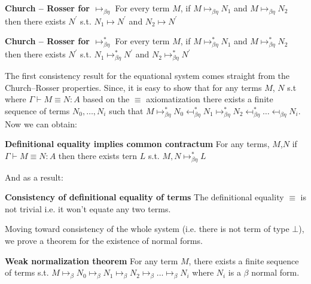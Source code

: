 \begin{mdframed}
	\begin{theorem}	\textbf{Church -- Rosser for $\mapsto_{\beta\eta}$}
		For every term $M$, if $M\mapsto_{\beta\eta} N_1$ and $M \mapsto_{\beta\eta} N_2$ then there exists $N^{'}$ s.t. $N_1 \mapsto N^{'}$ and $N_2\mapsto N^{'}$
		
	\end{theorem}	
	\begin{theorem}	\textbf{Church -- Rosser for $\mapsto_{\beta\eta}^{*}$}
		For every term $M$, if $M\mapsto_{\beta\eta}^{*} N_1$ and $M \mapsto_{\beta\eta}^{*} N_2$ then there exists $N^{'}$ s.t. $N_1 \mapsto_{\beta\eta}^{*} N^{'}$ and $N_2\mapsto_{\beta\eta}^{*} N^{'}$
		
	\end{theorem}	
\end{mdframed}
 The first consistency result for the equational system comes straight from the Church--Rosser properties. Since, it is  easy to show that for any terms $M$, $N$ s.t where $\Gamma\vdash M\equiv N: A$ based on the $\equiv$ axiomatization there exists a finite sequence of terms $N_0,\ldots, N_i$ such that $M\mapsto_{\beta\eta}^{*}N_0\mapsfrom_{\beta\eta}^{*} N_1\mapsto_{\beta\eta}^{*} N_2\mapsfrom_{\beta\eta}^{*}\ldots \mapsfrom_{\beta\eta} N_i$. Now we can obtain:
 \begin{mdframed}
 \begin{theorem}	\textbf{Definitional equality implies common contractum}
 	For any terms, $M$,$N$ if $\Gamma\vdash M\equiv N:A$ then there exists tern $L$ s.t. $M,N\mapsto_{\beta\eta}^{*} L$
 	
 \end{theorem}
\end{mdframed}
 And as a result:
 \begin{mdframed}	
 \begin{theorem}	\textbf{Consistency of definitional equality of terms}
 	The definitional equality $\equiv$ is not trivial i.e. it won't equate any two terms.
 \end{theorem}	
\end{mdframed}
Moving toward consistency of the whole system (i.e. there is not term of type $\bot$), we prove a theorem for the existence of normal forms.
\begin{mdframed}	
\begin{theorem}	\textbf{Weak normalization theorem}
For any term $M$, there exists a finite sequence of terms s.t. $M\mapsto_{\beta}N_0\mapsto_{\beta} N_1\mapsto_{\beta} N_2\mapsto_{\beta}\ldots \mapsto_{\beta} N_i$ where $N_i$ is a $\beta$ normal form.
\end{theorem}	
\end{mdframed}
